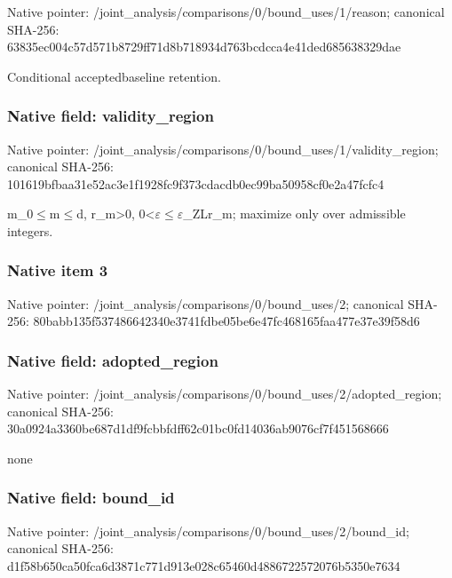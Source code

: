 \documentclass[10pt,a4paper]{article}
\begin{document}
Native pointer: /joint\_analysis/comparis\allowbreak{}ons/0/bound\_uses/1/reaso\allowbreak{}n; canonical SHA-256: 63835ec004c57d571b8729ff\allowbreak{}71d8b718934d763bcdcca4e4\allowbreak{}1ded685638329dae


Conditional acceptedbaseline retention.


\subsubsection{Native field: validity\_region}


Native pointer: /joint\_analysis/comparis\allowbreak{}ons/0/bound\_uses/1/valid\allowbreak{}ity\_region; canonical SHA-256: 101619bfbaa31e52ac3e1f19\allowbreak{}28fc9f373cdacdb0ec99ba50\allowbreak{}958cf0e2a47fcfc4


m\_0\ensuremath{\le}m\ensuremath{\le}d, r\_m>0, 0<\ensuremath{\varepsilon}\ensuremath{\le}\ensuremath{\varepsilon}\_ZLr\_m; maximize only over admissible integers.


\subsubsection{Native item 3}


Native pointer: /joint\_analysis/comparis\allowbreak{}ons/0/bound\_uses/2; canonical SHA-256: 80babb135f537486642340e3\allowbreak{}741fdbe05be6e47fc468165f\allowbreak{}aa477e37e39f58d6



\subsubsection{Native field: adopted\_region}


Native pointer: /joint\_analysis/comparis\allowbreak{}ons/0/bound\_uses/2/adopt\allowbreak{}ed\_region; canonical SHA-256: 30a0924a3360be687d1df9fc\allowbreak{}bbfdff62c01bc0fd14036ab9\allowbreak{}076cf7f451568666


none


\subsubsection{Native field: bound\_id}


Native pointer: /joint\_analysis/comparis\allowbreak{}ons/0/bound\_uses/2/bound\allowbreak{}\_id; canonical SHA-256: d1f58b650ca50fca6d3871c7\allowbreak{}71d913e028c65460d4886722\allowbreak{}572076b5350e7634
\end{document}
